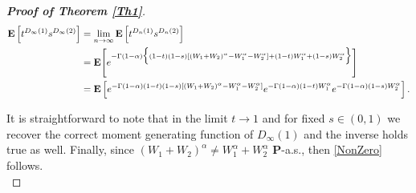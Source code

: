 \documentclass[11pt, reqno]{amsart}
\numberwithin{equation}{section}
\theoremstyle{plain} %
\theoremstyle{definition} %
\newcommand{\prob}{\mathbf{P}}
\newcommand{\E}{\mathbf{E}}
\begin{document}
\begin{proof}[{\bf Proof of Theorem \ref{Th1}}]
\begin{equation}
\begin{split}
     \E\left[ t^{D_\infty(1)} s^{D_\infty(2)} \right]&= \lim_{n \to \infty}   \E \left[ t^{D_n(1)} s^{D_n(2)}\right]  \\  %
    &=  \E \Bigg[ e^{- \Gamma(1- \alpha)  \Big{\{} (1-t)(1-s)\left[(W_1+W_2)^{\alpha} -W_1^{\alpha} - W_2^{\alpha}\right]  +(1-t) W_1^{\alpha} +  (1-s) W_2^{\alpha}  \Big{\}} }\Bigg]\\
    &= \E \left[ e^{- \Gamma(1- \alpha)   (1-t)(1-s) \left[(W_1+W_2)^{\alpha} -W_1^{\alpha} - W_2^{\alpha}\right]   } e^{- \Gamma(1- \alpha)    (1-t) W_1^{\alpha}  } e^{- \Gamma(1- \alpha)    (1-s) W_2^{\alpha}    } \right].
\end{split}
\end{equation}

It is straightforward to note that in the limit $t \to 1$ and for fixed $s\in (0,1)$ we recover the correct moment generating function of $D_\infty(1)$ and the inverse holds true as well. Finally, since  $(W_1+W_2)^{\alpha}\neq W_1^{\alpha} + W_2^{\alpha}$ $\prob$-a.s.,  then \eqref{NonZero}  follows.\\


\end{proof}
\end{document}
